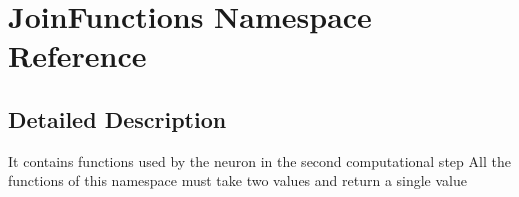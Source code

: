 \hypertarget{namespace_join_functions}{\section{Join\-Functions Namespace Reference}
\label{namespace_join_functions}
}


\subsection{Detailed Description}
It contains functions used by the neuron in the second computational step All the functions of this namespace must take two values and return a single value 